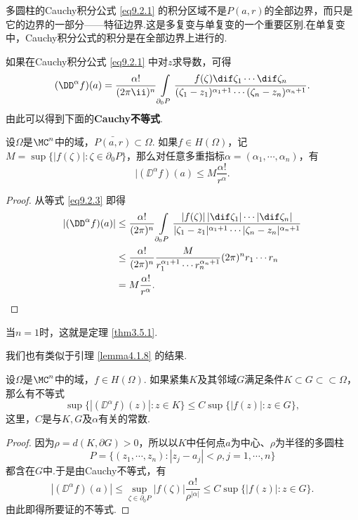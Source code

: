 多圆柱的Cauchy积分公式 \eqref{eq9.2.1} 的积分区域不是$P(a,r)$的全部边界，而只是它的边界的一部分——特征边界.这是多复变与单复变的一个重要区别.在单复变中，Cauchy积分公式的积分是在全部边界上进行的.

如果在Cauchy积分公式 \eqref{eq9.2.1} 中对$z$求导数，可得
\begin{equation}\label{eq9.2.3}
(\DD^\alpha f)(a)=\frac{\alpha!}{(2\pi\ii)^n}
\int\limits_{\partial_0P}
\frac{f(\zeta)\dif \zeta_1\cdots\dif \zeta_n}{(\zeta_1-z_1)^{\alpha_1+1}\cdots(\zeta_n-z_n)^{\alpha_n+1}}.
\end{equation}
由此可以得到下面的\textbf{Cauchy不等式}.
\begin{theorem}\label{thm9.2.2}
设$\Omega$是$\MC^n$中的域，$\bar{P(a,r)}\subset\Omega$. 如果$f\in H(\Omega)$，记$M=\sup\{|f(\zeta)|:\zeta\in\partial_0P\}$，那么对任意多重指标$\alpha=(\alpha_1,\cdots,\alpha_n)$，有
\[|(\DD^\alpha f)(a)\le M\frac{\alpha!}{r^\alpha}.\]
\end{theorem}
\begin{proof}
从等式 \eqref{eq9.2.3} 即得
\begin{align*}
  |(\DD^\alpha f)(a)|&\le\frac{\alpha!}{(2\pi)^n}
  \int\limits_{\partial_0P}
  \frac{|f(\zeta)|\,|\dif \zeta_1|\cdots|\dif \zeta_n|}{|\zeta_1-z_1|^{\alpha_1+1}\cdots|\zeta_n-z_n|^{\alpha_n+1}}\\
  & \le \frac{\alpha!}{(2\pi)^n}\frac M{r_1^{\alpha_1+1}\cdots r_n^{\alpha_n+1}} (2\pi)^nr_1\cdots r_n\\
  & = M\frac{\alpha!}{r^\alpha}. \qedhere
\end{align*}
\end{proof}

当$n=1$时，这就是定理 \ref{thm3.5.1}.

我们也有类似于引理 \ref{lemma4.1.8} 的结果.
\begin{theorem}\label{thm9.2.3}
设$\Omega$是$\MC^n$中的域，$f\in H(\Omega)$. 如果紧集$K$及其邻域$G$满足条件$K\subset G\subset\subset \Omega$，那么有不等式
\[\sup\{|(\DD^\alpha f)(z)|:z\in K\}\le C\sup\{|f(z)|:z\in G\},\]
这里，$C$是与$K,G$及$\alpha$有关的常数.
\end{theorem}
\begin{proof}
因为$\rho=d(K,\partial G)>0$，所以以$K$中任何点$a$为中心、$\rho$为半径的多圆柱
\[P=\{(z_1,\cdots,z_n):|z_j-a_j|<\rho,j=1,\cdots,n\}\]
都含在$G$中.于是由Cauchy不等式，有
\[|(\DD^\alpha f)(a)|\le\sup_{\zeta\in\partial_0P}|f(\zeta)|\frac{\alpha!}{\rho^{|\alpha|}}
\le C\sup\{|f(z)|:z\in G\}.\]
由此即得所要证的不等式.
\end{proof}

